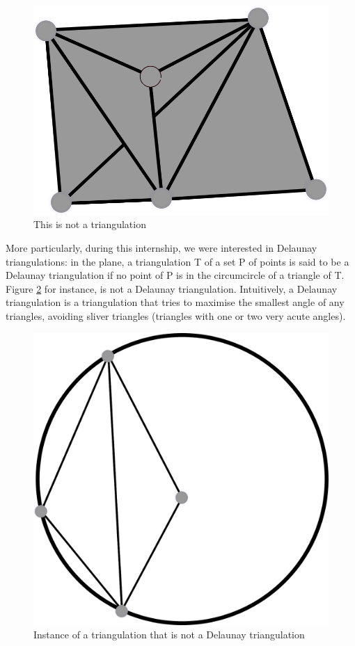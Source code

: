 \documentclass[a4paper,10pt]{article}
\begin{document}
\begin{figure}
  \centering
  \includegraphics[scale=2]{NotTrig2}
  \caption{\label{NotTrig2} This is not a triangulation}
\end{figure}


More particularly, during this internship, we were interested in Delaunay triangulations: in the plane, a triangulation T of a set P of points is said to be a Delaunay triangulation if no point of P is in the circumcircle of a triangle of T. Figure \ref{notDelaunay} for instance, is not a Delaunay triangulation. Intuitively, a Delaunay triangulation is a triangulation that tries to maximise the smallest angle of any triangles, avoiding sliver triangles (triangles with one or two very acute angles).
\label{DelaunayCondition}
\begin{figure}
\centering
\includegraphics[scale=1]{dessin2}
\caption{\label{notDelaunay} Instance of a triangulation that is not a Delaunay triangulation}

\end{figure}
\end{document}
